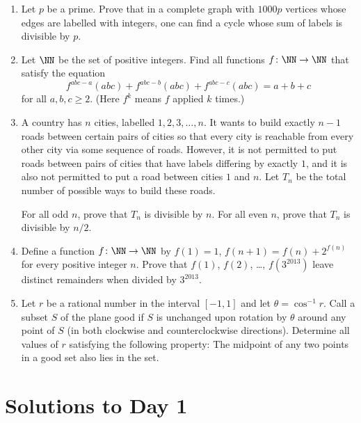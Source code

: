 \documentclass[11pt]{scrartcl}
\begin{document}
\begin{enumerate}[\bfseries 1.]
\item %
Let $p$ be a prime.
Prove that in a complete graph with $1000p$ vertices
whose edges are labelled with integers,
one can find a cycle whose sum of labels is divisible by $p$.

\item %
Let $\NN$ be the set of positive integers.
Find all functions $f \colon \NN \to \NN$ that satisfy the equation
\[ f^{abc-a}(abc) + f^{abc-b}(abc) + f^{abc-c}(abc) = a + b + c \]
for all $a,b,c \ge 2$. (Here $f^k$ means $f$ applied $k$ times.)

\item %
A country has $n$ cities, labelled $1,2,3,\dots,n$.
It wants to build exactly $n-1$ roads between certain pairs of cities
so that every city is reachable from every other city via some sequence of roads.
However, it is not permitted to put roads between pairs of cities
that have labels differing by exactly $1$,
and it is also not permitted to put a road between cities $1$ and $n$.
Let $T_n$ be the total number of possible ways to build these roads.
\begin{enumerate}[(a)]
  \ii For all odd $n$, prove that $T_n$ is divisible by $n$.
  \ii For all even $n$, prove that $T_n$ is divisible by $n/2$.
\end{enumerate}

\item %
Define a function $f \colon \NN \to \NN$ by $f(1) = 1$,
$f(n+1) = f(n) + 2^{f(n)}$ for every positive integer $n$.
Prove that $f(1)$, $f(2)$, \dots, $f(3^{2013})$
leave distinct remainders when divided by $3^{2013}$.

\item %
Let $r$ be a rational number in the interval $[-1,1]$
and let $\theta = \cos^{-1} r$.
Call a subset $S$ of the plane good if $S$ is unchanged
upon rotation by $\theta$ around any point of $S$
(in both clockwise and counterclockwise directions).
Determine all values of $r$ satisfying the following property:
The midpoint of any two points in a good set also lies in the set.

\end{enumerate}
\pagebreak

\section{Solutions to Day 1}
\end{document}
